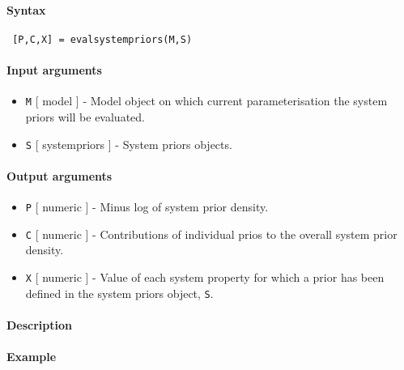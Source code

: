 


	\paragraph{Syntax}
 
 \begin{verbatim}
 [P,C,X] = evalsystempriors(M,S)
 \end{verbatim}
 
 \paragraph{Input arguments}
 
 \begin{itemize}
 \item
   \texttt{M} {[} model {]} - Model object on which current
   parameterisation the system priors will be evaluated.
 \item
   \texttt{S} {[} systempriors {]} - System priors objects.
 \end{itemize}
 
 \paragraph{Output arguments}
 
 \begin{itemize}
 \item
   \texttt{P} {[} numeric {]} - Minus log of system prior density.
 \item
   \texttt{C} {[} numeric {]} - Contributions of individual prios to the
   overall system prior density.
 \item
   \texttt{X} {[} numeric {]} - Value of each system property for which a
   prior has been defined in the system priors object, \texttt{S}.
 \end{itemize}
 
 \paragraph{Description}
 
 \paragraph{Example}


